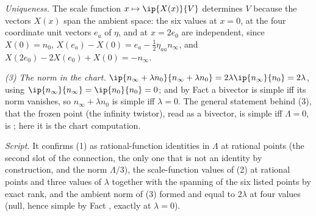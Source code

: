 \emph{Uniqueness.} The scale function $x \mapsto \ip{X(x)}{V}$ determines $V$ because the vectors $X(x)$ span the ambient space: the six values at $x = 0$, at the four coordinate unit vectors $e_{a}$ of $\eta$, and at $x = 2e_{0}$ are independent, since $X(0) = n_{0}$, $X(e_{a}) - X(0) = e_{a} - \tfrac12\eta_{aa}n_{\infty}$, and $X(2e_{0}) - 2X(e_{0}) + X(0) = -n_{\infty}$.

\emph{(3) The norm in the chart.} $\ip{n_{\infty} + \lambda n_{0}}{n_{\infty} + \lambda n_{0}} = 2\lambda\ip{n_{\infty}}{n_{0}} = 2\lambda$, using $\ip{n_{\infty}}{n_{\infty}} = \ip{n_{0}}{n_{0}} = 0$; and by Fact  a bivector is simple iff its norm vanishes, so $n_{\infty} + \lambda n_{0}$ is simple iff $\lambda = 0$. The general statement behind (3), that the frozen point (the infinity twistor), read as a bivector, is simple iff $\Lambda = 0$, is \cite[Cor.~4.8]{ButlerT9}; here it is the chart computation.

\emph{Script.} It confirms (1) as rational-function identities in $\Lambda$ at rational points (the second slot of the connection, the only one that is not an identity by construction, and the norm $\Lambda/3$), the scale-function values of (2) at rational points and three values of $\lambda$ together with the spanning of the six listed points by exact rank, and the ambient norm of (3) formed and equal to $2\lambda$ at four values (null, hence simple by Fact , exactly at $\lambda = 0$).
